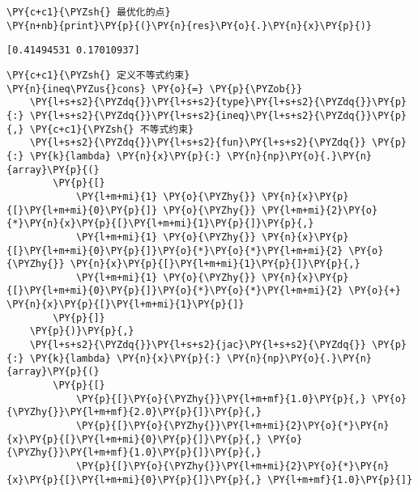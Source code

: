     \begin{tcolorbox}[breakable, size=fbox, boxrule=1pt, pad at break*=1mm,colback=cellbackground, colframe=cellborder]
\begin{Verbatim}[commandchars=\\\{\}]
\PY{c+c1}{\PYZsh{} 最优化的点}
\PY{n+nb}{print}\PY{p}{(}\PY{n}{res}\PY{o}{.}\PY{n}{x}\PY{p}{)}
\end{Verbatim}
\end{tcolorbox}

    \begin{Verbatim}[commandchars=\\\{\}]
[0.41494531 0.17010937]
    \end{Verbatim}

    \begin{tcolorbox}[breakable, size=fbox, boxrule=1pt, pad at break*=1mm,colback=cellbackground, colframe=cellborder]
\begin{Verbatim}[commandchars=\\\{\}]
\PY{c+c1}{\PYZsh{} 定义不等式约束}
\PY{n}{ineq\PYZus{}cons} \PY{o}{=} \PY{p}{\PYZob{}}
    \PY{l+s+s2}{\PYZdq{}}\PY{l+s+s2}{type}\PY{l+s+s2}{\PYZdq{}}\PY{p}{:} \PY{l+s+s2}{\PYZdq{}}\PY{l+s+s2}{ineq}\PY{l+s+s2}{\PYZdq{}}\PY{p}{,} \PY{c+c1}{\PYZsh{} 不等式约束}
    \PY{l+s+s2}{\PYZdq{}}\PY{l+s+s2}{fun}\PY{l+s+s2}{\PYZdq{}} \PY{p}{:} \PY{k}{lambda} \PY{n}{x}\PY{p}{:} \PY{n}{np}\PY{o}{.}\PY{n}{array}\PY{p}{(}
        \PY{p}{[}
            \PY{l+m+mi}{1} \PY{o}{\PYZhy{}} \PY{n}{x}\PY{p}{[}\PY{l+m+mi}{0}\PY{p}{]} \PY{o}{\PYZhy{}} \PY{l+m+mi}{2}\PY{o}{*}\PY{n}{x}\PY{p}{[}\PY{l+m+mi}{1}\PY{p}{]}\PY{p}{,}
            \PY{l+m+mi}{1} \PY{o}{\PYZhy{}} \PY{n}{x}\PY{p}{[}\PY{l+m+mi}{0}\PY{p}{]}\PY{o}{*}\PY{o}{*}\PY{l+m+mi}{2} \PY{o}{\PYZhy{}} \PY{n}{x}\PY{p}{[}\PY{l+m+mi}{1}\PY{p}{]}\PY{p}{,}
            \PY{l+m+mi}{1} \PY{o}{\PYZhy{}} \PY{n}{x}\PY{p}{[}\PY{l+m+mi}{0}\PY{p}{]}\PY{o}{*}\PY{o}{*}\PY{l+m+mi}{2} \PY{o}{+} \PY{n}{x}\PY{p}{[}\PY{l+m+mi}{1}\PY{p}{]}
        \PY{p}{]}
    \PY{p}{)}\PY{p}{,}
    \PY{l+s+s2}{\PYZdq{}}\PY{l+s+s2}{jac}\PY{l+s+s2}{\PYZdq{}} \PY{p}{:} \PY{k}{lambda} \PY{n}{x}\PY{p}{:} \PY{n}{np}\PY{o}{.}\PY{n}{array}\PY{p}{(}
        \PY{p}{[}
            \PY{p}{[}\PY{o}{\PYZhy{}}\PY{l+m+mf}{1.0}\PY{p}{,} \PY{o}{\PYZhy{}}\PY{l+m+mf}{2.0}\PY{p}{]}\PY{p}{,}
            \PY{p}{[}\PY{o}{\PYZhy{}}\PY{l+m+mi}{2}\PY{o}{*}\PY{n}{x}\PY{p}{[}\PY{l+m+mi}{0}\PY{p}{]}\PY{p}{,} \PY{o}{\PYZhy{}}\PY{l+m+mf}{1.0}\PY{p}{]}\PY{p}{,}
            \PY{p}{[}\PY{o}{\PYZhy{}}\PY{l+m+mi}{2}\PY{o}{*}\PY{n}{x}\PY{p}{[}\PY{l+m+mi}{0}\PY{p}{]}\PY{p}{,} \PY{l+m+mf}{1.0}\PY{p}{]}

\end{Verbatim}
\end{tcolorbox}
